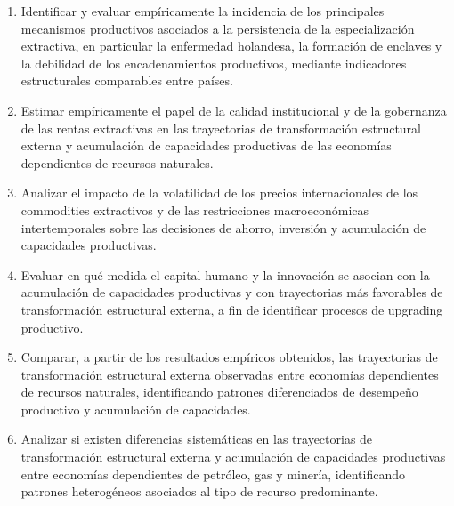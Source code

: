 \documentclass[../../PTFM.tex]{subfiles}
\begin{document}
	\begin{enumerate}



		\item Identificar y evaluar empíricamente la incidencia de los principales mecanismos productivos asociados a la persistencia de la especialización extractiva, en particular la enfermedad holandesa, la formación de enclaves y la debilidad de los encadenamientos productivos, mediante indicadores estructurales comparables entre países.



		\item Estimar empíricamente el papel de la calidad institucional y de la gobernanza de las rentas extractivas en las trayectorias de transformación estructural externa y acumulación de capacidades productivas de las economías dependientes de recursos naturales.



		\item Analizar el impacto de la volatilidad de los precios internacionales de los commodities extractivos y de las restricciones macroeconómicas intertemporales sobre las decisiones de ahorro, inversión y acumulación de capacidades productivas.



		\item Evaluar en qué medida el capital humano y la innovación se asocian con la acumulación de capacidades productivas y con trayectorias más favorables de transformación estructural externa, a fin de identificar procesos de upgrading productivo.



		\item Comparar, a partir de los resultados empíricos obtenidos, las trayectorias de transformación estructural externa observadas entre economías dependientes de recursos naturales, identificando patrones diferenciados de desempeño productivo y acumulación de capacidades.



		\item Analizar si existen diferencias sistemáticas en las trayectorias de transformación estructural externa y acumulación de capacidades productivas entre economías dependientes de petróleo, gas y minería, identificando patrones heterogéneos asociados al tipo de recurso predominante.



	\end{enumerate}
\end{document}

